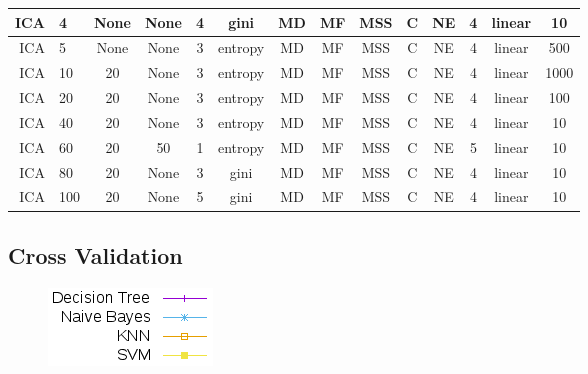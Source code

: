 \documentclass[10pt, a4paper]{article}
\begin{document}
\begin{scriptsize}
\begin{tabular}{|r|l||c|c|c|c||c|c|c|c|c||c||c|c|}
\hline
ICA & 4 & None & None & 4 & gini & MD & MF & MSS & C & NE & 4 & linear & 10 \\
\hline
ICA & 5 & None & None & 3 & entropy & MD & MF & MSS & C & NE & 4 & linear & 500 \\
\hline
ICA & 10 & 20 & None & 3 & entropy & MD & MF & MSS & C & NE & 4 & linear & 1000 \\
\hline
ICA & 20 & 20 & None & 3 & entropy & MD & MF & MSS & C & NE & 4 & linear & 100 \\
\hline
ICA & 40 & 20 & None & 3 & entropy & MD & MF & MSS & C & NE & 4 & linear & 10 \\
\hline
ICA & 60 & 20 & 50 & 1 & entropy & MD & MF & MSS & C & NE & 5 & linear & 10 \\
\hline
ICA & 80 & 20 & None & 3 & gini & MD & MF & MSS & C & NE & 4 & linear & 10 \\
\hline
ICA & 100 & 20 & None & 5 & gini & MD & MF & MSS & C & NE & 4 & linear & 10 \\
\hline
\end{tabular}
\end{scriptsize}

\subsection{Cross Validation}

\begin{figure}[H]
\includegraphics[scale=0.6]{../src/data/refs.png}
\end{figure}
\end{document}
